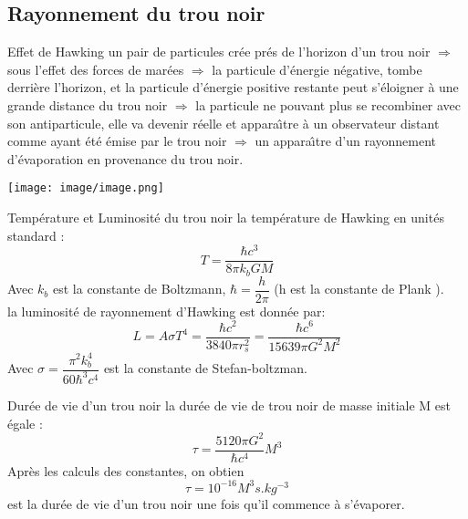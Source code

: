 \documentclass{beamer}
\begin{document}
\subsection{Rayonnement du trou noir}
\begin{frame}
\begin{block}{Effet de Hawking}
un pair de particules crée prés de l'horizon d'un trou noir $\Rightarrow$ sous l'effet des forces de marées $\Rightarrow$ la particule d'énergie négative, tombe derrière l'horizon, et
la particule d'énergie positive restante peut s'éloigner à une grande distance du trou noir $\Rightarrow$ la particule ne pouvant plus se recombiner avec son antiparticule, elle va devenir réelle et appara\^{\i}tre à un observateur distant comme ayant été émise par le trou noir $\Rightarrow$ un appara\^{\i}tre d'un rayonnement d'évaporation en provenance du trou noir.
\end{block}
  	\texttt{[image: image/image.png]}
\end{frame}

\begin{frame}
\begin{block}{Température et Luminosité du trou noir}
	la température de Hawking en unités standard :
	$$T=\dfrac{\hbar c^{3}}{8\pi k_{b}GM}$$
	Avec $k_{b}$ est la constante de Boltzmann, $\hbar = \dfrac{h}{2\pi}$ (h
	est la constante de Plank ).\\
	
	la luminosité de rayonnement d'Hawking est donnée par:
	$$L=A\sigma T^{4}=\dfrac{\hbar c^{2}}{3840\pi r_{s}^{2}}=\dfrac{\hbar c^{6}}{15639\pi G^{2}M^{2}}$$
	Avec $\sigma = \dfrac{\pi^{2}k_{b}^{4}}{60\hbar^{3}c^{4}}$  est la constante de Stefan-boltzman.
\end{block}
\end{frame}
\begin{frame}
\begin{block}{Durée de vie d'un trou noir}
	la durée de vie de trou noir de masse initiale M est égale :
	$$\tau=\dfrac{5120\pi G^{2}}{\hbar c^{4}}M^{3}$$
	Après les calculs des constantes, on obtien
    $$\tau = 10^{-16}M^{3}s.kg^{-3}$$
    est la durée de vie d'un trou noir une fois qu'il commence à s'évaporer.
\end{block}
\end{frame}
\end{document}
